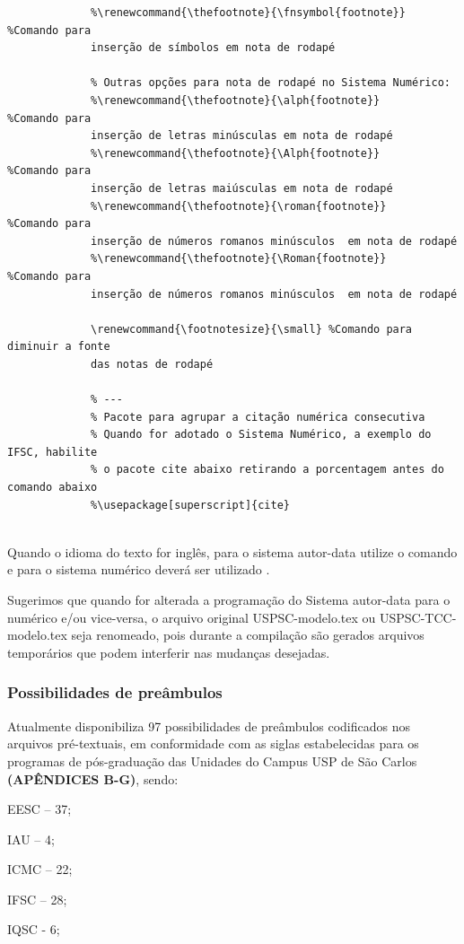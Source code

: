 \begin{verbatim}
			 %\renewcommand{\thefootnote}{\fnsymbol{footnote}} %Comando para 
			 inserção de símbolos em nota de rodapé
			  
			 % Outras opções para nota de rodapé no Sistema Numérico:
			 %\renewcommand{\thefootnote}{\alph{footnote}}     %Comando para 
			 inserção de letras minúsculas em nota de rodapé
			 %\renewcommand{\thefootnote}{\Alph{footnote}}     %Comando para 
			 inserção de letras maiúsculas em nota de rodapé
			 %\renewcommand{\thefootnote}{\roman{footnote}}    %Comando para 
			 inserção de números romanos minúsculos  em nota de rodapé
			 %\renewcommand{\thefootnote}{\Roman{footnote}}    %Comando para 
			 inserção de números romanos minúsculos  em nota de rodapé
			  
			 \renewcommand{\footnotesize}{\small} %Comando para diminuir a fonte 
			 das notas de rodapé	
			  
			 % ---
			 % Pacote para agrupar a citação numérica consecutiva
			 % Quando for adotado o Sistema Numérico, a exemplo do IFSC, habilite 
			 % o pacote cite abaixo retirando a porcentagem antes do comando abaixo
			 %\usepackage[superscript]{cite}
			  			  	
			 \end{verbatim}
		 
Quando o idioma do texto for inglês, para o sistema autor-data utilize o comando \verb++ e para o sistema numérico deverá ser utilizado \verb++.

Sugerimos que quando for alterada a programação do Sistema autor-data para o numérico e/ou vice-versa, o arquivo original USPSC-modelo.tex ou USPSC-TCC-modelo.tex seja renomeado, pois durante a compilação são gerados arquivos temporários que podem interferir nas mudanças desejadas.			 

\subsubsection{Possibilidades de preâmbulos}

Atualmente disponibiliza 97 possibilidades de preâmbulos codificados nos arquivos pré-textuais, em conformidade com as siglas estabelecidas para os programas de pós-graduação das Unidades do Campus USP de São Carlos \textbf{(APÊNDICES B-G)}, sendo:
	
				  
			   \begin{alineas}
			   	\item EESC – 37;
				\item IAU – 4;
				\item  ICMC – 22;
				\item  IFSC – 28;
				\item  IQSC - 6;
			  \end{alineas}	
			  
